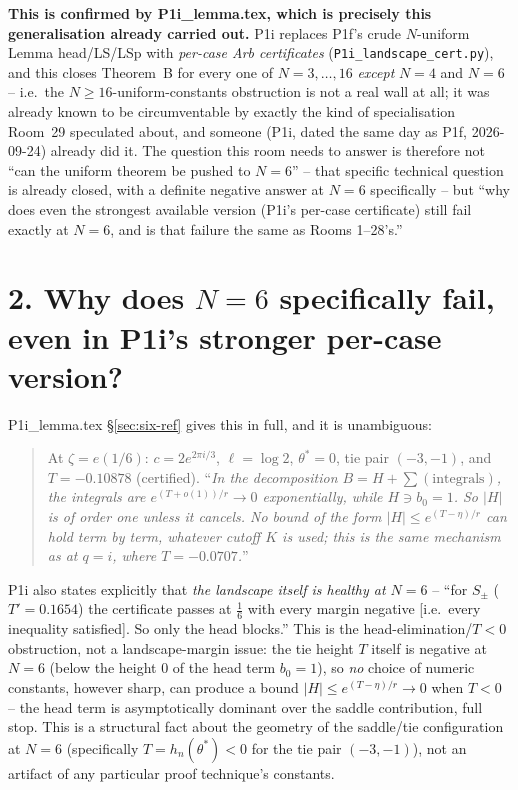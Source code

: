 \documentclass[11pt]{article}
\begin{document}
\textbf{This is confirmed by P1i\_lemma.tex, which is precisely this generalisation already carried
out.} P1i replaces P1f's crude $N$-uniform Lemma head/LS/LSp with \emph{per-case Arb certificates}
(\texttt{P1i\_landscape\_cert.py}), and this closes Theorem~B for every one of $N=3,\ldots,16$
\emph{except} $N=4$ and $N=6$ -- i.e.\ the $N\ge16$-uniform-constants obstruction is not a real wall
at all; it was already known to be circumventable by exactly the kind of specialisation Room~29
speculated about, and someone (P1i, dated the same day as P1f, 2026-09-24) already did it. The
question this room needs to answer is therefore not ``can the uniform theorem be pushed to
$N=6$'' -- that specific technical question is already closed, with a definite negative answer at
$N=6$ specifically -- but ``why does even the strongest available version (P1i's per-case
certificate) still fail exactly at $N=6$, and is that failure the same as Rooms 1--28's.''

\section*{2. Why does $N=6$ specifically fail, even in P1i's stronger per-case version?}
P1i\_lemma.tex \S\ref{sec:six-ref} gives this in full, and it is unambiguous:
\begin{quote}
At $\zeta=e(1/6)$: $c=2e^{2\pi i/3}$, $\ell=\log2$, $\theta^*=0$, tie pair $(-3,-1)$, and
$T=-0.10878$ (certified). ``\emph{In the decomposition $B=H+\sum(\text{integrals})$, the integrals
are $e^{(T+o(1))/r}\to0$ exponentially, while $H\ni b_0=1$. So $|H|$ is of order one unless it
cancels. No bound of the form $|H|\le e^{(T-\eta)/r}$ can hold term by term, whatever cutoff $K$ is
used; this is the same mechanism as at $q=i$, where $T=-0.0707$.}''
\end{quote}
P1i also states explicitly that \emph{the landscape itself is healthy at $N=6$} -- ``for $S_\pm$
($T'=0.1654$) the certificate passes at $\frac16$ with every margin negative [i.e.\ every
inequality satisfied]. So only the head blocks.'' This is the head-elimination/$T<0$ obstruction,
not a landscape-margin issue: the tie height $T$ itself is negative at $N=6$ (below the height $0$
of the head term $b_0=1$), so \emph{no} choice of numeric constants, however sharp, can produce a
bound $|H|\le e^{(T-\eta)/r}\to0$ when $T<0$ -- the head term is asymptotically dominant over the
saddle contribution, full stop. This is a structural fact about the geometry of the saddle/tie
configuration at $N=6$ (specifically $T=h_n(\theta^*)<0$ for the tie pair $(-3,-1)$), not an
artifact of any particular proof technique's constants.
\end{document}
